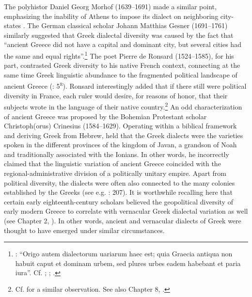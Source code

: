 The polyhistor Daniel Georg Morhof (1639–1691) made a similar point, emphasizing the inability of Athens to impose its dialect on neighboring city-states \citep[146]{Morhof1685}. The German classical scholar Johann Matthias Gesner (1691–1761) similarly suggested that Greek dialectal diversity was caused by the fact that “ancient Greece did not have a capital and dominant city, but several cities had the same and equal rights”.\footnote{\citet[160--161]{Gesner1774}: “Origo autem dialectorum uariarum haec est; quia Graecia antiqua non habuit caput et dominam urbem, sed plures urbes eadem habebant et paria iura”. Cf. \citet[395--396]{Rollin1731}; \citet[136--138]{Priestley1762}; \citet[204]{Ries1786}.} The poet Pierre de Ronsard (1524–1585), for his part, contrasted Greek diversity to his native French context, connecting at the same time Greek linguistic abundance to the fragmented political landscape of ancient Greece (\citeyear{Ronsard1565}: 5\textsc{\textsuperscript{r}}). Ronsard interestingly added that if there still were political diversity in France, each ruler would desire, for reasons of honor, that their subjects wrote in the language of their native country.\footnote{Cf. \citet[lxviii]{Court1778} for a similar observation. See also Chapter 8, .} An odd characterization of ancient Greece was proposed by the Bohemian Protestant scholar Christoph(orus) Crinesius (1584–1629). Operating within a biblical framework and deriving Greek from Hebrew, \citet[77]{Crinesius1629} held that the Greek dialects were the varieties spoken in the different provinces of the kingdom of Javan, a grandson of Noah and traditionally associated with the Ionians. In other words, he incorrectly claimed that the linguistic variation of ancient Greece coincided with the regional-administrative division of a politically unitary empire. Apart from political diversity, the dialects were often also connected to the many colonies established by the Greeks (see e.g. \citealt{Simonis1752}: 207). It is worthwhile recalling here that certain early eighteenth-century scholars believed the geopolitical diversity of early modern Greece to correlate with vernacular Greek dialectal variation as well (see Chapter 2, ). In other words, ancient and vernacular dialects of Greek were thought to have emerged under similar circumstances.

